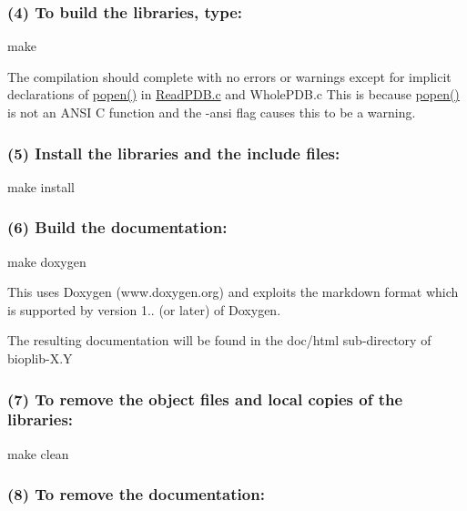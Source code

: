 \subsubsection*{(4) To build the libraries, type\-:}

\begin{DoxyVerb}     make 
\end{DoxyVerb}


The compilation should complete with no errors or warnings except for implicit declarations of \hyperlink{openorpipe_8c_af78772fbd79937a93ce4a787b011a520}{popen()} in \hyperlink{_read_p_d_b_8c}{Read\-P\-D\-B.\-c} and Whole\-P\-D\-B.\-c This is because \hyperlink{openorpipe_8c_af78772fbd79937a93ce4a787b011a520}{popen()} is not an A\-N\-S\-I C function and the -\/ansi flag causes this to be a warning.

\subsubsection*{(5) Install the libraries and the include files\-:}

\begin{DoxyVerb}     make install
\end{DoxyVerb}


\subsubsection*{(6) Build the documentation\-:}

\begin{DoxyVerb}     make doxygen
\end{DoxyVerb}


This uses Doxygen (www.\-doxygen.\-org) and exploits the markdown format which is supported by version 1.. (or later) of Doxygen.

The resulting documentation will be found in the doc/html sub-\/directory of bioplib-\/\-X.\-Y

\subsubsection*{(7) To remove the object files and local copies of the libraries\-:}

\begin{DoxyVerb}     make clean
\end{DoxyVerb}


\subsubsection*{(8) To remove the documentation\-:}

